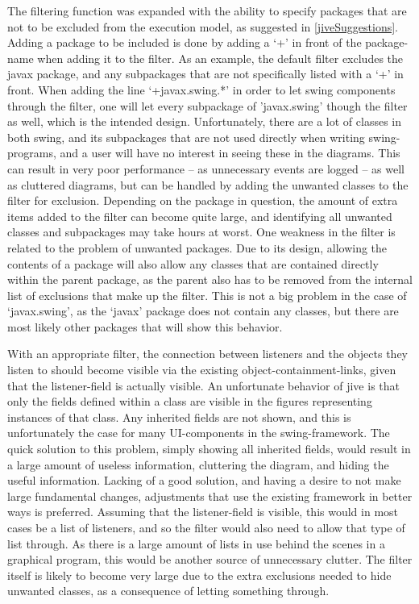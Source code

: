 The filtering function was expanded with the ability to specify packages that are not to be excluded from the execution model, as suggested in \autoref{jiveSuggestions}.
Adding a package to be included is done by adding a `+' in front of the package-name when adding it to the filter.
As an example, the default filter excludes the javax package, and any subpackages that are not specifically listed with a `+' in front.
When adding the line `+javax.swing.*' in order to let swing components through the filter, one will let every subpackage of 'javax.swing' though the filter as well, which is the intended design.
Unfortunately, there are a lot of classes in both swing, and its subpackages that are not used directly when writing swing-programs, and a user will have no interest in seeing these in the diagrams.
This can result in very poor performance -- as unnecessary events are logged -- as well as cluttered diagrams, but can be handled by adding the unwanted classes to the filter for exclusion.
Depending on the package in question, the amount of extra items added to the filter can become quite large, and identifying all unwanted classes and subpackages may take hours at worst.
One weakness in the filter is related to the problem of unwanted packages.
Due to its design, allowing the contents of a package will also allow any classes that are contained directly within the parent package, as the parent also has to be removed from the internal list of exclusions that make up the filter.
This is not a big problem in the case of `javax.swing', as the `javax' package does not contain any classes, but there are most likely other packages that will show this behavior.

With an appropriate filter, the connection between listeners and the objects they listen to should become visible via the existing object-containment-links, given that the listener-field is actually visible.
An unfortunate behavior of \gls{jive} is that only the fields defined within a class are visible in the figures representing instances of that class.
Any inherited fields are not shown, and this is unfortunately the case for many UI-components in the swing-framework.
The quick solution to this problem, simply showing all inherited fields, would result in a large amount of useless information, cluttering the diagram, and hiding the useful information.
Lacking of a good solution, and having a desire to not make large fundamental changes, adjustments that use the existing framework in better ways is preferred.
Assuming that the listener-field is visible, this would in most cases be a list of listeners, and so the filter would also need to allow that type of list through.
As there is a large amount of lists in use behind the scenes in a graphical program, this would be another source of unnecessary clutter.
The filter itself is likely to become very large due to the extra exclusions needed to hide unwanted classes, as a consequence of letting something through.

